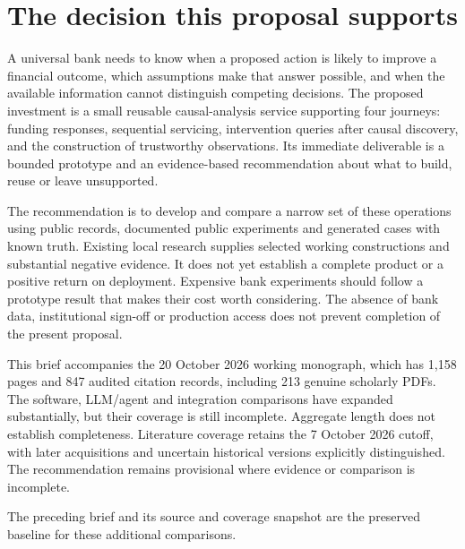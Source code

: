 \hypertarget{the-decision-this-proposal-supports}{%
\section{The decision this proposal
supports}\label{the-decision-this-proposal-supports}}

A universal bank needs to know when a proposed action is likely to
improve a financial outcome, which assumptions make that answer
possible, and when the available information cannot distinguish
competing decisions. The proposed investment is a small reusable
causal-analysis service supporting four journeys: funding responses,
sequential servicing, intervention queries after causal discovery, and
the construction of trustworthy observations. Its immediate deliverable
is a bounded prototype and an evidence-based recommendation about what
to build, reuse or leave unsupported.

The recommendation is to develop and compare a narrow set of these
operations using public records, documented public experiments and
generated cases with known truth. Existing local research supplies
selected working constructions and substantial negative evidence. It
does not yet establish a complete product or a positive return on
deployment. Expensive bank experiments should follow a prototype result
that makes their cost worth considering. The absence of bank data,
institutional sign-off or production access does not prevent completion
of the present proposal. \citep{sp13_scope}

This brief accompanies the 20 October 2026 working monograph, which has
1,158 pages and 847 audited citation records, including 213 genuine
scholarly PDFs. The software, LLM/agent and integration comparisons have
expanded substantially, but their coverage is still incomplete.
Aggregate length does not establish completeness. Literature coverage
retains the 7 October 2026 cutoff, with later acquisitions and uncertain
historical versions explicitly distinguished. The recommendation remains
provisional where evidence or comparison is incomplete.
\citep{sp20hy_reader,sp20je_reader,sp20nc_reader,sp20gc_reader,sp20ea_reader,sp20vm_reader,sp20pye_reader,sp20fx_reader,sp20pa_reader,sp20rfx_reader}

The preceding brief and its source and coverage snapshot are the
preserved baseline for these additional comparisons.
\citep{sp18_reader,sp18_progress,sp18_census,sp19rs_reader,sp19rs_progress,sp19em_reader,sp19em_progress,sp19oi_reader,sp19oi_progress}

